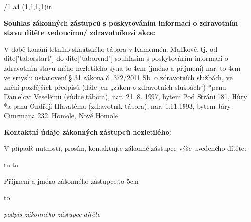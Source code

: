 
\typosize[11/13]
\margins/1 a4 (1,1,1,1)in
\chyph
\fontfam[timesroman]
\nopagenumbers
\parindent=0cm

{\bf Souhlas zákonných zástupců s poskytováním informací o zdravotním stavu dítěte vedoucímu/ zdravotníkovi akce:}

V době konání letního skautského tábora v Kamenném Malíkově, tj. od {{dite["taborstart"]}} do {{dite["taborend"]}}
souhlasím s poskytováním informací o zdravotním stavu mého nezletilého syna 
\hbox to 4cm{ \dotfill} (jméno a příjmení) nar.
\hbox to 4cm{\dotfill}
ve smyslu ustanovení § 31 zákona č. 372/2011 Sb. o zdravotních službách, ve znění pozdějších předpisů (dále jen „zákon o zdravotních službách“) 
\begitems
*panu Danielovi Veselému (vůdce tábora), nar. 21. 8. 1997, bytem Pod Strání 181, Hůry
*a panu Ondřeji Hlavatému (zdravotník tábora), nar. 1.11.1993, bytem Járy Cimrmana 232, Homole, Nové Homole

\enditems
\bigskip

{\bf Kontaktní údaje zákonných zástupců nezletilého:}

V případě nutnosti, prosím, kontaktujte zákonné zástupce výše uvedeného dítěte:\bigskip

\hbox to 
\bigskip
\hbox to 

\vskip 2cm

\medskip
\medskip
\medskip
\medskip
\medskip
Příjmení a jméno zákonného zástupce:\hbox to 5cm{\dotfill}
\medskip
\medskip

\hbox to 

{\hfill\it\typosize[7/13]podpis zákonného zástupce dítěte}

\bye

